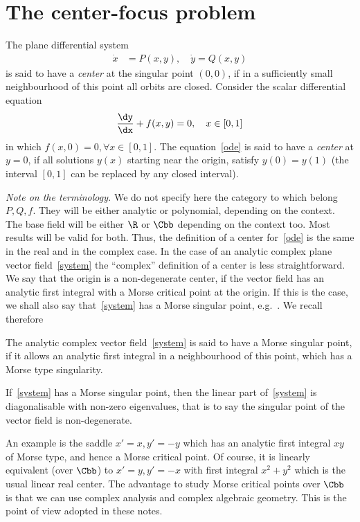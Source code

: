 \section{The center-focus problem}

The plane differential system
\begin{align}\label{system}
\dot{x} &= P(x,y), \quad
\dot{y}= Q(x,y)
\end{align}
is said to have a \emph{center} at the singular point $(0,0)$, if in a sufficiently small neighbourhood of this point all orbits are closed. Consider the scalar differential equation
\begin{align}\label{ode}
\frac{\dy}{\dx} + f(x,y) = 0,\quad x\in [0,1]
\end{align}
in which $f(x,0) =0, \forall x\in [0,1]$. The equation~\eqref{ode} is said to have a \emph{center} at $y=0$, if all solutions $y(x)$ starting near the origin, satisfy $y(0)=y(1)$ (the interval $[0,1]$ can be replaced by any closed interval).


\emph{Note on the terminology.} We do not specify here the category to which belong $P, Q, f$. They will be either analytic or polynomial, depending on the context. The base field will be either $\R$ or $\Cbb$ depending on the context too. Most results will be valid for both. Thus, the definition of a center for~\eqref{ode} is the same in the real and in the complex case. In the case of an analytic complex plane vector field~\eqref{system} the ``complex'' definition of a center is less straightforward. We say that the origin is a non-degenerate center, if the vector field has an analytic first integral with a Morse critical point at the origin. If this is the case, we shall also say that~\eqref{system} has a Morse singular point, e.g.~\cite{cerlin96,dul08}. We recall therefore
\begin{defi}
The analytic complex vector field~\eqref{system} is said to have a Morse singular point, if it allows an analytic first integral in a neighbourhood of this point, which has a Morse type singularity.
\end{defi}

If~\eqref{system} has a Morse singular point, then the linear part of~\eqref{system} is diagonalisable with non-zero eigenvalues, that is to say the singular point of the vector field is non-degenerate.

An example is the saddle $x'=x, y'=-y$ which has an analytic first integral $xy$ of Morse type, and hence a Morse critical point. Of course, it is linearly equivalent (over $\Cbb$) to $x'=y,y'=-x$ with first integral $x^2+y^2$ which is the usual linear real center. The advantage to study Morse critical points over $\Cbb$ is that we can use complex analysis and complex algebraic geometry. This is the point of view adopted in these notes.

